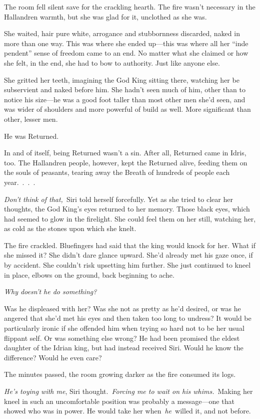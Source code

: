 The room fell silent save for the crackling hearth. The fire wasn’t necessary in the Hallandren warmth, but she was glad for it, unclothed as she was.

She waited, hair pure white, arrogance and stubbornness discarded, naked in more than one way. This was where she ended up—this was where all her “inde pendent” sense of freedom came to an end. No matter what she claimed or how she felt, in the end, she had to bow to authority. Just like anyone else.

She gritted her teeth, imagining the God King sitting there, watching her be subservient and naked before him. She hadn’t seen much of him, other than to notice his size—he was a good foot taller than most other men she’d seen, and was wider of shoulders and more powerful of build as well. More significant than other, lesser men.

He was Returned.

In and of itself, being Returned wasn’t a sin. After all, Returned came in Idris, too. The Hallandren people, however, kept the Returned alive, feeding them on the souls of peasants, tearing away the Breath of hundreds of people each year.~.~.~.

\textit{Don’t think of that,}~Siri told herself forcefully. Yet as she tried to clear her thoughts, the God King’s eyes returned to her memory. Those black eyes, which had seemed to glow in the firelight. She could feel them on her still, watching her, as cold as the stones upon which she knelt.

The fire crackled. Bluefingers had said that the king would knock for her. What if she missed it? She didn’t dare glance upward. She’d already met his gaze once, if by accident. She couldn’t risk upsetting him further. She just continued to kneel in place, elbows on the ground, back beginning to ache.

\textit{Why doesn’t he do something?}

Was he displeased with her? Was she not as pretty as he’d desired, or was he angered that she’d met his eyes and then taken too long to undress? It would be particularly ironic if she offended him when trying so hard not to be her usual flippant self. Or was something else wrong? He had been promised the eldest daughter of the Idrian king, but had instead received Siri. Would he know the difference? Would he even care?

The minutes passed, the room growing darker as the fire consumed its logs.

\textit{He’s toying with me}, Siri thought.~\textit{Forcing me to wait on his whims.}~Making her kneel in such an uncomfortable position was probably a message—one that showed who was in power. He would take her when~\textit{he}~willed it, and not before.

